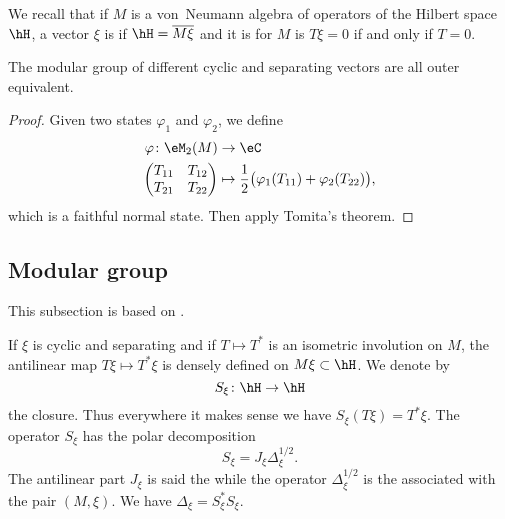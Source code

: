 We recall that if $M$ is a von~Neumann algebra of operators of the Hilbert space $\hH$, a vector $\xi$ is  if $\hH=\overline{ M\xi }$ and it is  for $M$ is $T\xi=0$ if and only if $T=0$.

\begin{theorem}
The modular group of different cyclic and separating vectors are all outer equivalent.
\end{theorem}

\begin{proof}
	Given two states $\varphi_1$ and $\varphi_2$, we define
	\begin{equation}	
		\begin{aligned}
			\varphi\colon \eM_2(M)&\to \eC \\
			\begin{pmatrix}
				T_{11}&	T_{12}	\\ 
				T_{21}	&	T_{22}	
			\end{pmatrix}
			&\mapsto \frac{ 1 }{2}\big( \varphi_1(T_{11})+\varphi_2(T_{22}) \big), 
		\end{aligned}
	\end{equation}
	which is a faithful normal state. Then apply Tomita's theorem.
\end{proof}

\subsection{Modular group}
This subsection is based on \cite{CirpianiDirichlet}.

If $\xi$ is cyclic and separating and if $T\mapsto T^*$ is an isometric involution on $M$, the antilinear map $T\xi\mapsto T^*\xi$ is densely defined on $M\xi\subset\hH$. We denote by
\begin{equation}
	S_{\xi}\colon \hH\to \hH
\end{equation}
the closure. Thus everywhere it makes sense we have $S_{\xi}(T\xi)=T^*\xi$. The operator $S_{\xi}$ has the polar decomposition
\begin{equation}
	S_{\xi}=J_{\xi}\Delta^{1/2}_{\xi}.
\end{equation}
The antilinear part $J_{\xi}$ is said the  while the operator $\Delta^{1/2}_{\xi}$ is the  associated with the pair $(M,\xi)$. We have $\Delta_{\xi}=S_{\xi}^*S_{\xi}$.

